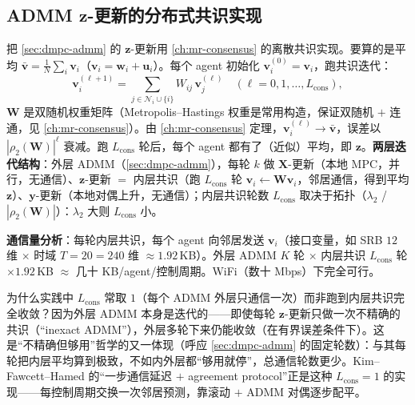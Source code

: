 \subsection{ADMM \texorpdfstring{$\mathbf{z}$}{z}-更新的分布式共识实现}
\label{sec:dmpc-z-consensus}

把 \cref{sec:dmpc-admm} 的 $\mathbf{z}$-更新用 \cref{ch:mr-consensus} 的离散共识实现。要算的是平均 $\bar{\mathbf{v}}=\tfrac1N\sum_i\mathbf{v}_i$（$\mathbf{v}_i=\mathbf{w}_i+\mathbf{u}_i$）。每个 agent 初始化 $\mathbf{v}_i^{(0)}=\mathbf{v}_i$，跑共识迭代：
\begin{equation}
  \mathbf{v}_i^{(\ell+1)}=\sum_{j\in\mathcal{N}_i\cup\{i\}}W_{ij}\,\mathbf{v}_j^{(\ell)}\quad(\ell=0,1,\dots,L_{\text{cons}}),
  \label{eq:dmpc-inner-consensus}
\end{equation}
$\mathbf{W}$ 是双随机权重矩阵（Metropolis--Hastings 权重是常用构造，保证双随机 $+$ 连通，见 \cref{ch:mr-consensus}）。由 \cref{ch:mr-consensus} 定理，$\mathbf{v}_i^{(\ell)}\to\bar{\mathbf{v}}$，误差以 $|\rho_2(\mathbf{W})|^\ell$ 衰减。跑 $L_{\text{cons}}$ 轮后，每个 agent 都有了（近似）平均，即 $\mathbf{z}$。\textbf{两层迭代结构}：外层 ADMM（\cref{sec:dmpc-admm}），每轮 $k$ 做 $\mathbf{X}$-更新（本地 MPC，并行，无通信）、$\mathbf{z}$-更新 $=$ 内层共识（跑 $L_{\text{cons}}$ 轮 $\mathbf{v}_i\leftarrow\mathbf{W}\mathbf{v}_i$，邻居通信，得到平均 $\mathbf{z}$）、$\mathbf{y}$-更新（本地对偶上升，无通信）；内层共识轮数 $L_{\text{cons}}$ 取决于拓扑（$\lambda_2$ / $|\rho_2(\mathbf{W})|$）：$\lambda_2$ 大则 $L_{\text{cons}}$ 小。

\textbf{通信量分析}：每轮内层共识，每个 agent 向邻居发送 $\mathbf{v}_i$（接口变量，如 SRB $12$ 维 $\times$ 时域 $T=20=240$ 维 $\approx1.92$\,KB）。外层 ADMM $K$ 轮 $\times$ 内层共识 $L_{\text{cons}}$ 轮 $\times1.92$\,KB $\approx$ 几十 KB/agent/控制周期。WiFi（数十 Mbps）下完全可行。

\begin{insight}\label{ins:dmpc-inexact}
为什么实践中 $L_{\text{cons}}$ 常取 $1$（每个 ADMM 外层只通信一次）而非跑到内层共识完全收敛？因为外层 ADMM 本身是迭代的——即使每轮 $\mathbf{z}$-更新只做一次不精确的共识（“inexact ADMM”），外层多轮下来仍能收敛（在有界误差条件下）。这是“不精确但够用”哲学的又一体现（呼应 \cref{sec:dmpc-admm} 的固定轮数）：与其每轮把内层平均算到极致，不如内外层都“够用就停”，总通信轮数更少。Kim--Fawcett--Hamed\cite{kim2023layered} 的“一步通信延迟 $+$ agreement protocol”正是这种 $L_{\text{cons}}=1$ 的实现——每控制周期交换一次邻居预测，靠滚动 $+$ ADMM 对偶逐步配平。
\end{insight}

